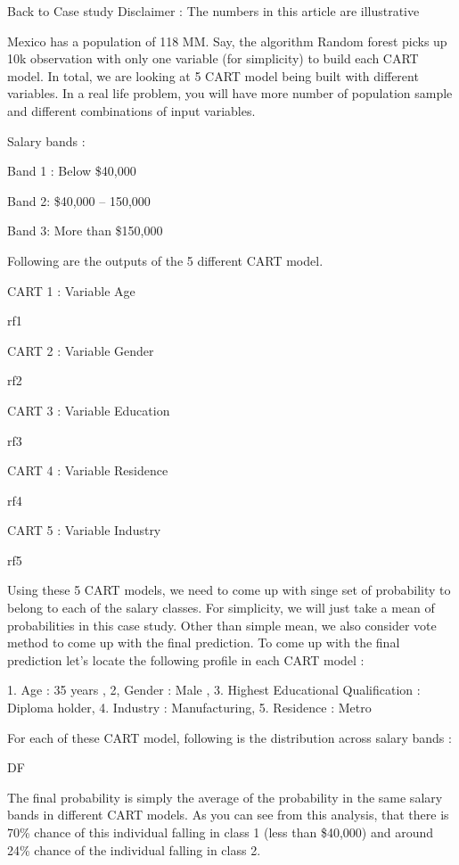 Back to Case  study
Disclaimer : The numbers in this article are illustrative

Mexico has a population of 118 MM. Say, the algorithm Random forest picks up 10k observation with only one variable (for simplicity) to build each CART model. In total, we are looking at 5 CART model being built with different variables. In a real life problem, you will have more number of population sample and different combinations of  input variables.

Salary bands :

Band 1 : Below \$40,000

Band 2: \$40,000 – 150,000

Band 3: More than \$150,000

Following are the outputs of the 5 different CART model.

CART 1 : Variable Age

rf1

CART 2 : Variable Gender

rf2

CART 3 : Variable Education

rf3

CART 4 : Variable Residence

rf4

CART 5 : Variable Industry

rf5

Using these 5 CART models, we need to come up with singe set of probability to belong to each of the salary classes. For simplicity, we will just take a mean of probabilities in this case study. Other than simple mean, we also consider vote method to come up with the final prediction. To come up with the final prediction let’s locate the following profile in each CART model :

1. Age : 35 years , 2, Gender : Male , 3. Highest Educational Qualification : Diploma holder, 4. Industry : Manufacturing, 5. Residence : Metro

For each of these CART model, following is the distribution across salary bands :

DF

The final probability is simply the average of the probability in the same salary bands in different CART models. As you can see from this analysis, that there is 70\% chance of this individual falling in class 1 (less than \$40,000) and around 24\% chance of the individual falling in class 2.

